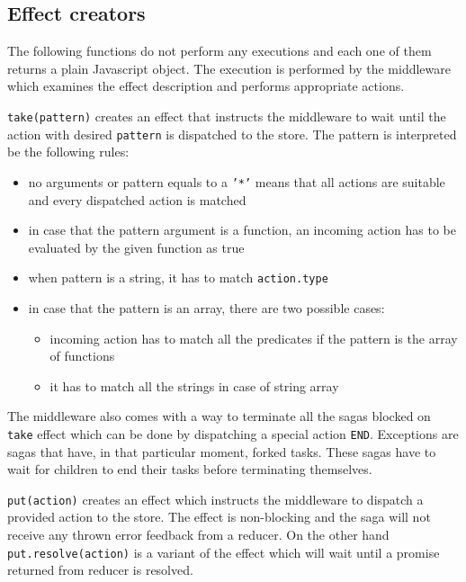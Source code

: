 \subsection{Effect creators}\label{effect_creators}
The following functions do not perform any executions and each one of them returns a plain Javascript object. The execution is performed by the middleware which examines the effect description and performs appropriate actions.

\texttt{take(pattern)} creates an effect that instructs the middleware to wait until the action with desired \texttt{pattern} is dispatched to the store. The pattern is interpreted be the following rules: 

\begin{itemize}
\item no arguments or pattern equals to a \texttt{'*'} means that all actions are suitable and every dispatched action is matched
\item in case that the pattern argument is a function, an incoming action has to be evaluated by the given function as true
\item when pattern is a string, it has to match \texttt{action.type}
\item in case that the pattern is an array, there are two possible cases:

\begin{itemize}
\item incoming action has to match all the 			predicates if the pattern is the array of functions
\item it has to match all the strings in case of string array
\end{itemize}  
\end{itemize}  

The middleware also comes with a way to terminate all the sagas blocked on \texttt{take} effect which can be done by dispatching a special action \texttt{END}. Exceptions are sagas that have, in that particular moment, forked tasks. These sagas have to wait for children to end their tasks before terminating themselves.

\texttt{put(action)} creates an effect which instructs the middleware to dispatch a provided action to the store. The effect is non-blocking and the saga will not receive any thrown error feedback from a reducer. On the other hand \texttt{put.resolve(action)} is a variant of the effect which will wait until a promise returned from reducer is resolved.

